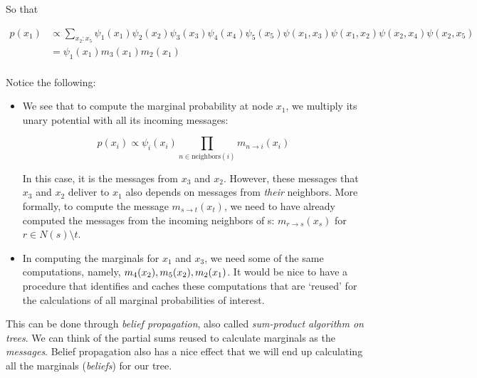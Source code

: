 \documentclass{harvardml}
\theoremstyle{definition}
\theoremstyle{plain}
\theoremstyle{definition}
\theoremstyle{remark}
\begin{document}
So that
\begin{center}
\begin{align*}
p(x_1) &\propto \sum_{x_2:x_5} \psi_1(x_1) \psi_2(x_2) \psi_3(x_3) \psi_4(x_4) \psi_5(x_5) \psi(x_1,x_3) \psi(x_1,x_2) \psi(x_2,x_4) \psi(x_2,x_5)\\
&=\psi_1(x_1) m_3(x_1) m_2(x_1)\\
\end{align*}
\end{center}

Notice the following:
\begin{itemize}
\item We see that to compute the marginal probability at node $x_1$, we multiply its unary potential with all its incoming messages:

$$p(x_i)\propto \psi_i(x_i)\prod_{n \in \text{neighbors}(i)}m_{n \rightarrow i}(x_i)$$

In this case, it is the messages from $x_3$ and $x_2$. However, these messages that $x_3$ and $x_2$ deliver to $x_1$ also depends on messages from \emph{their} neighbors. More formally, to compute the message $m_{s \rightarrow t}(x_t)$, we need to have already computed the messages from the incoming neighbors of s: $m_{r \rightarrow s}(x_s)$ for $r \in N(s) \setminus t$. 
\item In computing the marginals for $x_1$ and $x_3$, we need some of the same computations, namely, 
$m_4(x_2), m_5(x_2), \\m_2(x_1)$. 
It would be nice to have a procedure that identifies and caches these computations that are `reused' for the calculations of all marginal probabilities of interest.   
\end{itemize}


This can be done through \emph{belief propagation}, also called \emph{sum-product algorithm on trees}. We can think of the partial sums reused to calculate marginals as the \emph{messages}. Belief propagation also has a nice effect that we will end up calculating all the marginals (\emph{beliefs}) for our tree.\\
\end{document}
